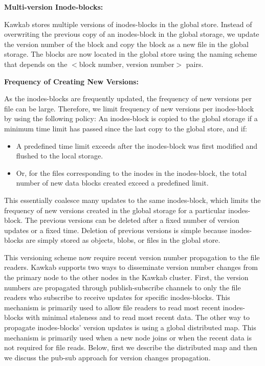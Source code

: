 \documentclass[]{article}
\newcommand{\subtopic}[1]{\vspace{1.5pt} \noindent \textbf{#1}}
\begin{document}
\subtopic{Multi-version Inode-blocks:} 


Kawkab stores multiple versions of inodes-blocks in the global store.  Instead
of overwriting the previous copy of an inodes-block in the global storage, we
update the version number of the block and copy the block as a new file in the
global storage. The blocks are now located in the global store using the naming
scheme that depends on the $<$block number,  version number$>$ pairs.


\subtopic{Frequency of Creating New Versions:}

As the inodes-blocks are frequently updated, the frequency of new versions
per file can be large. Therefore, we limit frequency of new versions 
per inodes-block by using the following policy:
An inodes-block is copied to the global storage if a minimum time limit
has passed since the last copy to the global store, and if:

\begin{itemize}

\item A predefined time limit exceeds after the inodes-block was first modified
and flushed to the local storage.

\item Or, for the files corresponding to the inodes in the inodes-block, 
      the total number of new data blocks created exceed a predefined limit.

\end{itemize}

This essentially coalesce many updates to the same inodes-block, which limits
the frequency of new versions created in the global storage for a particular
inodes-block. The previous versions can be deleted after a fixed number of
version updates or a fixed time. Deletion of previous versions is simple
because inodes-blocks are simply stored as objects, blobs, or files in the
global store.

This versioning scheme now require recent version number propagation to the
file readers. Kawkab supports two ways to disseminate version number changes
from the primary node to the other nodes in the Kawkab cluster. First, the
version numbers are propagated through publish-subscribe channels to only
the file readers who subscribe to receive updates for specific inodes-blocks.
This mechanism is primarily used to allow file readers to read most recent
inodes-blocks with minimal staleness and to read most recent data. The other 
way to propagate inodes-blocks' version updates is using a global distributed 
map. This mechanism is primarily used when a new node joins or when the recent
data is not required for file reads. Below, first we describe the distributed
map and then we discuss the pub-sub approach for version changes propagation.
\end{document}
